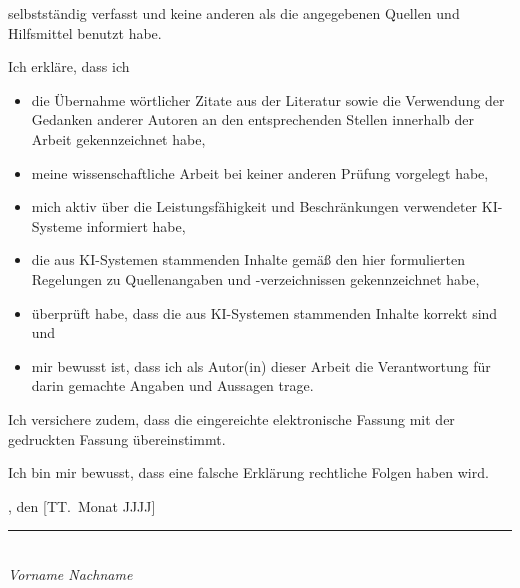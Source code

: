\documentclass[11pt,a4paper,oneside]{book}
\begin{document}
selbstständig verfasst und keine anderen als die angegebenen Quellen und Hilfsmittel benutzt habe.

Ich erkläre, dass ich

\begin{itemize}
    \item die Übernahme wörtlicher Zitate aus der Literatur sowie die Verwendung der Gedanken anderer Autoren an den entsprechenden Stellen innerhalb der Arbeit gekennzeichnet habe,

    \item meine wissenschaftliche Arbeit bei keiner anderen Prüfung vorgelegt habe,

    \item mich aktiv über die Leistungsfähigkeit und Beschränkungen verwendeter KI-Systeme informiert habe,

    \item die aus KI-Systemen stammenden Inhalte gemäß den hier formulierten Regelungen zu Quellenangaben und -verzeichnissen gekennzeichnet habe,

    \item überprüft habe, dass die aus KI-Systemen stammenden Inhalte korrekt sind und

    \item mir bewusst ist, dass ich als Autor(in) dieser Arbeit die Verantwortung für darin gemachte Angaben und Aussagen trage.
\end{itemize}

Ich versichere zudem, dass die eingereichte elektronische Fassung mit der gedruckten Fassung übereinstimmt.

Ich bin mir bewusst, dass eine falsche Erklärung rechtliche Folgen haben wird.

\vspace{0.8cm}

\noindent
[Ort], den [TT.\ Monat JJJJ]                                      %

\vspace{0.6cm}

\noindent
\rule{5cm}{0.4pt}\\
\textit{Vorname Nachname}                                        %
\end{document}
